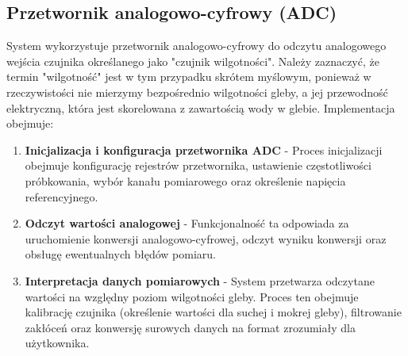 \documentclass{article}
\begin{document}
\subsection{Przetwornik analogowo-cyfrowy (ADC)}
System wykorzystuje przetwornik analogowo-cyfrowy do odczytu analogowego wejścia czujnika określanego jako "czujnik wilgotności". Należy zaznaczyć, że termin "wilgotność" jest w tym przypadku skrótem myślowym, ponieważ w rzeczywistości nie mierzymy bezpośrednio wilgotności gleby, a jej przewodność elektryczną, która jest skorelowana z zawartością wody w glebie. Implementacja obejmuje:

\begin{enumerate}
    \item \textbf{Inicjalizacja i konfiguracja przetwornika ADC} - Proces inicjalizacji obejmuje konfigurację rejestrów przetwornika, ustawienie częstotliwości próbkowania, wybór kanału pomiarowego oraz określenie napięcia referencyjnego.
    
    \item \textbf{Odczyt wartości analogowej} - Funkcjonalność ta odpowiada za uruchomienie konwersji analogowo-cyfrowej, odczyt wyniku konwersji oraz obsługę ewentualnych błędów pomiaru.
    
    \item \textbf{Interpretacja danych pomiarowych} - System przetwarza odczytane wartości na względny poziom wilgotności gleby. Proces ten obejmuje kalibrację czujnika (określenie wartości dla suchej i mokrej gleby), filtrowanie zakłóceń oraz konwersję surowych danych na format zrozumiały dla użytkownika.
\end{enumerate}
\end{document}
